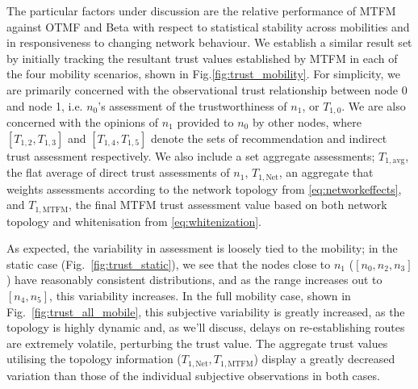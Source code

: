 \documentclass[runningheads,a4paper]{llncs}
\begin{document}
The particular factors under discussion are the relative performance of MTFM against OTMF and Beta with respect to statistical stability across mobilities and in responsiveness to changing network behaviour. 
We establish a similar result set by initially tracking the resultant trust values established by MTFM in each of the four mobility scenarios, shown in Fig.\ref{fig:trust_mobility}.
For simplicity, we are primarily concerned with the observational trust relationship between node 0 and node 1, i.e. $n_0$'s assessment of the trustworthiness of $n_1$, or $T_{1,0}$.
We are also concerned with the opinions of $n_1$ provided to $n_0$ by other nodes, where $[T_{1,2},T_{1,3}]$ and $[T_{1,4},T_{1,5}]$ denote the sets of recommendation and indirect trust assessment respectively.
We also include a set  aggregate assessments; $T_{1,\text{avg}}$, the flat average of direct trust assessments of $n_1$, $T_{1,\text{Net}}$, an aggregate that weights assessments according to the network topology from \eqref{eq:networkeffects}, and $T_{1,\text{MTFM}}$, the final MTFM trust assessment value based on both network topology and whitenisation from \eqref{eq:whitenization}.

As expected, the variability in assessment is loosely tied to the mobility; in the static case (Fig.~\ref{fig:trust_static}), we see that the nodes close to $n_1$ ($[n_0,n_2,n_3]$) have reasonably consistent distributions, and as the range increases out to $[n_4,n_5]$, this variability increases.
In the full mobility case, shown in Fig.~\ref{fig:trust_all_mobile}, this subjective variability is greatly increased, as the topology is highly dynamic and, as we'll discuss, delays on re-establishing routes are extremely volatile, perturbing the trust value.
The aggregate trust values utilising the topology information ($T_{1,\text{Net}},T_{1,\text{MTFM}}$) display a greatly decreased variation than those of the individual subjective observations in both cases.
\end{document}
